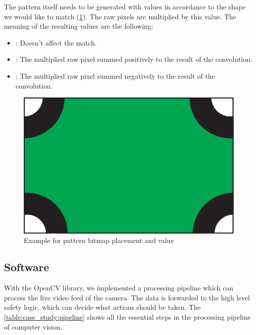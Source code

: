 The pattern itself needs to be generated with values in accordance to the shape we would like to match (\cref{fig:case_study:convoluter_image}). The raw pixels are multiplied by this value. The meaning of the resulting values are the following: 
\begin{itemize}
	\item {}: Doesn't affect the match.
	\item {}: The multiplied raw pixel summed positively to the result of the convolution.
	\item {}: The multiplied raw pixel summed negatively to the result of the convolution.
\end{itemize}

\begin{figure}[h]
	\centering
	\includegraphics[valign=c,width=.5\linewidth]{include/figures/chapter_6/math_2}
	\caption{Example for pattern bitmap placement and value}
	\label{fig:case_study:convoluter_image}
\end{figure}

\subsection{Software}

With the OpenCV library, we implemented a processing pipeline which can process the live video feed of the camera. The data is forwarded to the high level safety logic, which can decide what actions should be taken. The \cref{table:case_study:pipeline} shows all the essential steps in the processing pipeline of computer vision.

